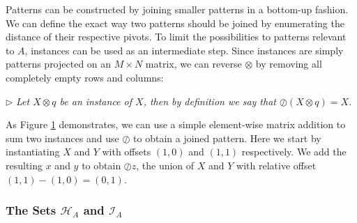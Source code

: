 \documentclass{llncs}
\begin{document}
Patterns can be constructed by joining smaller patterns in a bottom-up fashion. We can define the exact way two patterns should be joined by enumerating the distance of their respective pivots. To limit the possibilities to patterns relevant to $A$, instances can be used as an intermediate step. Since instances are simply patterns projected on an $M\times N$ matrix, we can reverse $\otimes$ by removing all completely empty rows and columns:

\smallskip
\noindent $\triangleright$
\emph{Let $X \otimes {q}$ be an instance of $X$, then by definition we say that $\oslash(X \otimes {q}) = X$.}
\smallskip

As Figure \ref{example2} demonstrates, we can use a simple element-wise matrix addition to sum two instances and use $\oslash$ to obtain a joined pattern. Here we start by instantiating $X$ and $Y$ with offsets $(1,0)$ and $(1,1)$ respectively. We add the resulting ${x}$ and ${y}$ to obtain $\oslash{z}$, the union of $X$ and $Y$ with relative offset $(1,1)-(1,0)=(0,1)$. %

\begin{figure}[b]
\centering

\label{example2}
\end{figure}




\subsubsection{The Sets $\mathcal{H}_A$ and $\mathcal{I}_A$}\label{thesetH}

\end{document}
